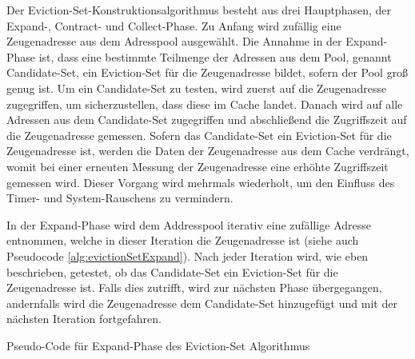 Der Eviction-Set-Konstruktionsalgorithmus besteht aus drei Hauptphasen, der Expand-, Contract- und Collect-Phase. 
Zu Anfang wird zufällig eine Zeugenadresse aus dem Adresspool ausgewählt.
Die Annahme in der Expand-Phase ist, dass eine bestimmte Teilmenge der Adressen aus dem Pool, genannt Candidate-Set, ein Eviction-Set für die Zeugenadresse bildet, sofern der Pool groß genug ist. 
Um ein Candidate-Set zu testen, wird zuerst auf die Zeugenadresse zugegriffen, um sicherzustellen, dass diese im Cache landet.
Danach wird auf alle Adressen aus dem Candidate-Set zugegriffen und abschließend die Zugriffszeit auf die Zeugenadresse gemessen. 
Sofern das Candidate-Set ein Eviction-Set für die Zeugenadresse ist, werden die Daten der Zeugenadresse aus dem Cache verdrängt, womit bei einer erneuten Messung der Zeugenadresse eine erhöhte Zugriffszeit gemessen wird.
Dieser Vorgang wird mehrmals wiederholt, um den Einfluss des Timer- und System-Rauschens zu vermindern.

In der Expand-Phase wird dem Addresspool iterativ eine zufällige Adresse entnommen, welche in dieser Iteration die Zeugenadresse ist (siehe auch Pseudocode \ref{alg:evictionSetExpand}).
Nach jeder Iteration wird, wie eben beschrieben, getestet, ob das Candidate-Set ein Eviction-Set für die Zeugenadresse ist.
Falls dies zutrifft, wird zur nächsten Phase übergegangen, andernfalls wird die Zeugenadresse dem Candidate-Set hinzugefügt und mit der nächsten Iteration fortgefahren.

\begin{algorithm}[h]
\DontPrintSemicolon
\caption{Pseudo-Code für Expand-Phase des Eviction-Set Algorithmus}
\label{alg:evictionSetExpand}

\end{algorithm}

